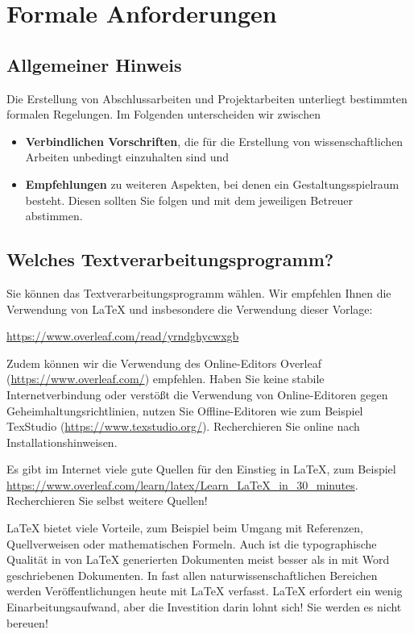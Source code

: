 \chapter{Formale Anforderungen}
\label{chap:anforderungen}

\section{Allgemeiner Hinweis}

Die Erstellung von Abschlussarbeiten und Projektarbeiten unterliegt bestimmten formalen Regelungen. 
Im Folgenden unterscheiden wir zwischen

\begin{itemize}
    \item \textbf{Verbindlichen Vorschriften}, die für die Erstellung von wissenschaftlichen Arbeiten unbedingt einzuhalten sind und
    \item \textbf{Empfehlungen} zu weiteren Aspekten, bei denen ein Gestaltungsspielraum besteht. Diesen sollten Sie folgen und mit dem jeweiligen Betreuer abstimmen.
\end{itemize}

\section{Welches Textverarbeitungsprogramm?}

Sie können das Textverarbeitungsprogramm wählen. Wir empfehlen Ihnen die Verwendung von \LaTeX{} und insbesondere die Verwendung dieser Vorlage:

\begin{center}
 \url{https://www.overleaf.com/read/yrndghycwxgb}   
\end{center}

Zudem können wir die Verwendung des Online-Editors Overleaf (\url{https://www.overleaf.com/}) empfehlen. Haben Sie keine stabile Internetverbindung oder verstößt die Verwendung von Online-Editoren gegen Geheimhaltungsrichtlinien, nutzen Sie Offline-Editoren wie zum Beispiel TexStudio (\url{https://www.texstudio.org/}). Recherchieren Sie online nach Installationshinweisen.

Es gibt im Internet viele gute Quellen für den Einstieg in \LaTeX{}, zum Beispiel \url{https://www.overleaf.com/learn/latex/Learn_LaTeX_in_30_minutes}. Recherchieren Sie selbst weitere Quellen!

\LaTeX{} bietet viele Vorteile, zum Beispiel beim Umgang mit Referenzen, Quellverweisen oder mathematischen Formeln. Auch ist die typographische Qualität in von \LaTeX{} generierten Dokumenten meist besser als in mit Word geschriebenen Dokumenten. In fast allen naturwissenschaftlichen Bereichen werden Veröffentlichungen heute mit \LaTeX{} verfasst. \LaTeX{} erfordert ein wenig Einarbeitungsaufwand, aber die Investition darin lohnt sich! Sie werden es nicht bereuen!

